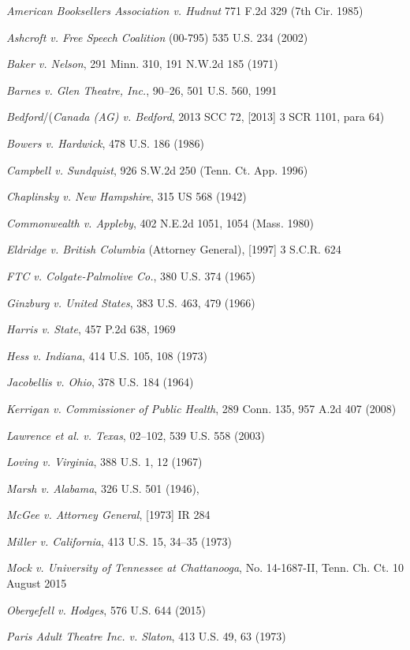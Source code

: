 \documentclass[paper=a4,book,openany]{jlreq}
\newenvironment{mylist}{\small \list{}{}{}   \itemindent=-1\zw}{\endlist}
\begin{document}
\begin{mylist}

\item \emph{American Booksellers Association v. Hudnut} 771 F.2d 329 (7th Cir. 1985)
\item \emph{Ashcroft v. Free Speech Coalition} (00-795) 535 U.S. 234 (2002)
\item \emph{Baker v. Nelson}, 291 Minn. 310, 191 N.W.2d 185 (1971)
\item \emph{Barnes v. Glen Theatre, Inc.}, 90--26, 501 U.S. 560, 1991
\item \emph{Bedford}/(\emph{Canada (AG) v. Bedford}, 2013 SCC 72, [2013] 3 SCR 1101, para 64)
\item \emph{Bowers v. Hardwick}, 478 U.S. 186 (1986)
\item \emph{Campbell v. Sundquist}, 926 S.W.2d 250 (Tenn. Ct. App. 1996)
\item \emph{Chaplinsky v. New Hampshire}, 315 US 568 (1942)
\item \emph{Commonwealth v. Appleby}, 402 N.E.2d 1051, 1054 (Mass. 1980)
\item \emph{Eldridge v. British Columbia} (Attorney General), [1997] 3 S.C.R. 624
\item \emph{FTC v. Colgate-Palmolive Co.}, 380 U.S. 374 (1965)
\item \emph{Ginzburg v. United States}, 383 U.S. 463, 479 (1966)
\item \emph{Harris v. State}, 457 P.2d 638, 1969
\item \emph{Hess v. Indiana}, 414 U.S. 105, 108 (1973)
\item \emph{Jacobellis v. Ohio}, 378 U.S. 184 (1964) 
\item \emph{Kerrigan v. Commissioner of Public Health}, 289 Conn. 135, 957 A.2d 407 (2008)
\item \emph{Lawrence et al. v. Texas}, 02--102, 539 U.S. 558 (2003)
\item \emph{Loving v. Virginia}, 388 U.S. 1, 12 (1967)
\item \emph{Marsh v. Alabama}, 326 U.S. 501 (1946),
\item \emph{McGee v. Attorney General}, [1973] IR 284
\item \emph{Miller v. California}, 413 U.S. 15, 34--35 (1973)
\item \emph{Mock v. University of Tennessee at Chattanooga}, No. 14-1687-II, Tenn. Ch. Ct. 10 August 2015
\item \emph{Obergefell v. Hodges}, 576 U.S. 644 (2015)
\item \emph{Paris Adult Theatre Inc. v. Slaton}, 413 U.S. 49, 63 (1973)

\end{mylist}
\end{document}
